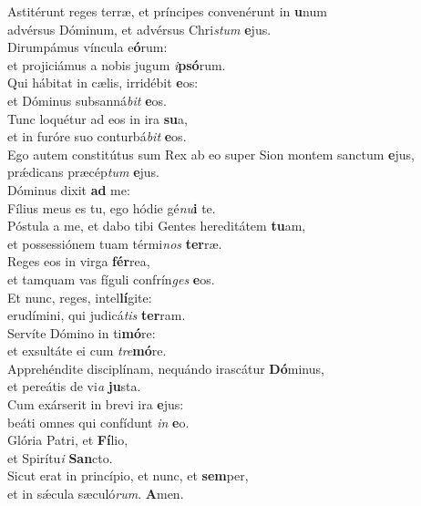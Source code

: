\evenverse Astitérunt reges terræ, et príncipes convenérunt in \textbf{u}num~\*\\
\evenverse advérsus Dóminum, et advérsus Chri\textit{stum} \textbf{e}jus.\\
\oddverse Dirumpámus víncula e\textbf{ó}rum:~\*\\
\oddverse et projiciámus a nobis jugum \textit{i}\textbf{psó}rum.\\
\evenverse Qui hábitat in cælis, irridébit \textbf{e}os:~\*\\
\evenverse et Dóminus subsanná\textit{bit} \textbf{e}os.\\
\oddverse Tunc loquétur ad eos in ira \textbf{su}a,~\*\\
\oddverse et in furóre suo conturbá\textit{bit} \textbf{e}os.\\
\evenverse Ego autem constitútus sum Rex ab eo super Sion montem sanctum \textbf{e}jus,~\*\\
\evenverse prǽdicans præcép\textit{tum} \textbf{e}jus.\\
\oddverse Dóminus dixit \textbf{ad} me:~\*\\
\oddverse Fílius meus es tu, ego hódie gé\textit{nu}\textbf{i} te.\\
\evenverse Póstula a me, et dabo tibi Gentes hereditátem \textbf{tu}am,~\*\\
\evenverse et possessiónem tuam térmi\textit{nos} \textbf{ter}ræ.\\
\oddverse Reges eos in virga \textbf{fér}rea,~\*\\
\oddverse et tamquam vas fíguli confrín\textit{ges} \textbf{e}os.\\
\evenverse Et nunc, reges, intel\textbf{lí}gite:~\*\\
\evenverse erudímini, qui judicá\textit{tis} \textbf{ter}ram.\\
\oddverse Servíte Dómino in ti\textbf{mó}re:~\*\\
\oddverse et exsultáte ei cum \textit{tre}\textbf{mó}re.\\
\evenverse Apprehéndite disciplínam, nequándo irascátur \textbf{Dó}minus,~\*\\
\evenverse et pereátis de vi\textit{a} \textbf{ju}sta.\\
\oddverse Cum exárserit in brevi ira \textbf{e}jus:~\*\\
\oddverse beáti omnes qui confídunt \textit{in} \textbf{e}o.\\
\evenverse Glória Patri, et \textbf{Fí}lio,~\*\\
\evenverse et Spirítu\textit{i} \textbf{San}cto.\\
\oddverse Sicut erat in princípio, et nunc, et \textbf{sem}per,~\*\\
\oddverse et in sǽcula sæculó\textit{rum}. \textbf{A}men.\\
